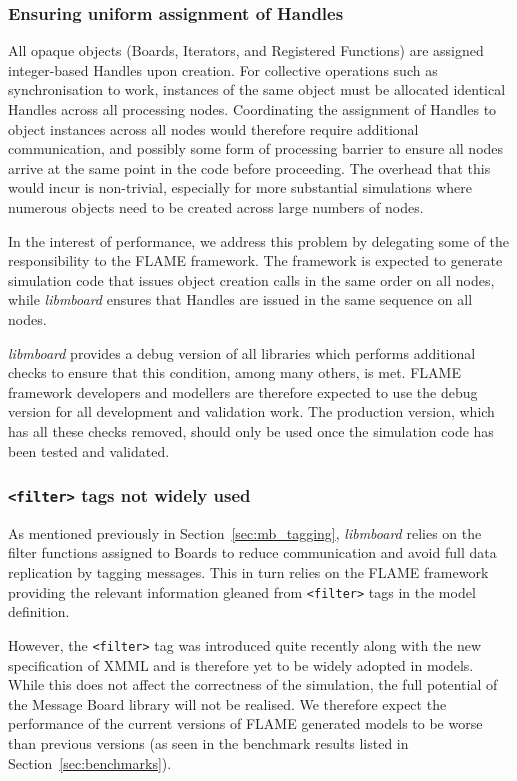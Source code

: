 \subsubsection{Ensuring uniform assignment of Handles}

All opaque objects (Boards, Iterators, and Registered Functions) are assigned integer-based Handles upon creation. For collective operations such as synchronisation to work, instances of the same object must be allocated identical Handles across all processing nodes. Coordinating the assignment of Handles to object instances across all nodes would therefore require additional communication, and possibly some form of processing barrier to ensure all nodes arrive at the same point in the code before proceeding. 
The overhead that this would incur is non-trivial, especially for more substantial simulations where numerous objects need to be created across large numbers of nodes. 

In the interest of performance, we address this problem by delegating some of the responsibility to the FLAME framework. The framework is expected to generate  simulation code that issues object creation calls in the same order on all nodes, while \textit{libmboard} ensures that Handles are issued in the same sequence on all nodes. 

\textit{libmboard} provides a debug version of all libraries which performs additional checks to ensure that this condition, among many others, is met. FLAME framework developers and modellers are therefore expected to use the debug version for all development and validation work. The production version, which has all these checks removed, should only be used once the simulation code has been tested and validated.


\subsubsection{\texttt{<filter>} tags not widely used}

As mentioned previously in Section~\ref{sec:mb_tagging}, \textit{libmboard} relies on the filter functions assigned to Boards to reduce communication and avoid full data replication by tagging messages. This in turn relies on the FLAME framework providing the relevant information gleaned from \texttt{<filter>} tags in the model definition.

However, the \texttt{<filter>} tag was introduced quite recently along with the new specification of XMML and is therefore yet to be widely adopted in models. While this does not affect the correctness of the simulation, the full potential of the Message Board library will not be realised. We therefore expect the performance of the current versions of FLAME generated models to be worse than previous versions (as seen in the benchmark results listed in Section~\ref{sec:benchmarks}).


